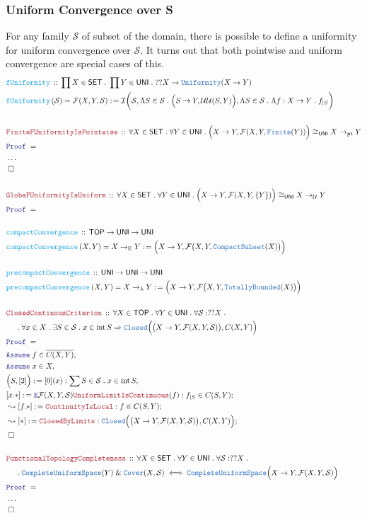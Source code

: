 \documentclass[12pt]{scrartcl}
\newcommand{\TYPE}[1]{\textcolor{NavyBlue}{\mathtt{#1}}}
\newcommand{\FUNC}[1]{\textcolor{Cerulean}{\mathtt{#1}}}
\newcommand{\LOGIC}[1]{\textcolor{Blue}{\mathtt{#1}}}
\newcommand{\THM}[1]{\textcolor{Maroon}{\mathtt{#1}}}
\renewcommand{\.}{\; . \;}
\newcommand{\de}{: \kern 0.1pc =}
\newcommand{\Act}[1]{\left( #1 \right)}
\newcommand{\Theorem}[2]{& \THM{#1} \, :: \, #2 \\ & \Proof = \\ }
\newcommand{\DeclareFunc}[2]{& \FUNC{#1} \, :: \, #2 \\}
\newcommand{\DefineNamedFunc}[4]{&  \FUNC{#1}\Act{#2} = #3 \de #4 \\}
\newcommand{\NewLine}{\\ & \kern 1pc}
\newcommand{\Page}[1]{ \begin{align*} #1 \end{align*}   }
\newcommand{\NoProof}{ & \ldots \\ \EndProof}
\renewcommand{\And}{\; \& \;}
\newcommand{\Imply}{\Rightarrow}
\newcommand{\Finite}{\TYPE{Finite}}
\newcommand{\Say}[3]{& #1 \de #2 : #3, \\}
\newcommand{\Conclude}[3]{& #1 \de #2 : #3; \\}
\newcommand{\DeriveConclude}[3]{& \leadsto #1 \de #2 : #3 ; \\}
\newcommand{\AssumeIn}[2]{& \LOGIC{Assume} \; #1 \in #2, \\}
\newcommand{\Elim}{\LOGIC{E}}
\newcommand{\QED}{\; \square}
\newcommand{\EndProof}{& \QED \\}
\newcommand{\Proof}{\LOGIC{Proof} \; }
\newcommand{\I}{\mathcal{I}}
\newcommand{\SET}{\mathsf{SET}}
\newcommand{\Closed}{\TYPE{Closed}}
\newcommand{\Compacts}{\TYPE{CompactSubset}}
\DeclareMathOperator*{\intx}{int}
\newcommand{\TOP}{\mathsf{TOP}}
\renewcommand{\U}{\mathcal{U}}
\newcommand{\F}{\mathcal{F}}
\newcommand{\UNI}{\mathsf{UNI}}
\renewcommand{\S}{\mathcal{S}}
\newcommand{\Unif}{\TYPE{Uniformity}}
\newcommand{\CUS}{\TYPE{CompleteUniformSpace}}
\newcommand{\TB}{\TYPE{TotallyBounded}}
\newcommand{\pt}{\mathrm{pt}}
\renewcommand{\S}{\mathcal{S}}
\begin{document}
\subsubsection{Uniform Convergence over S}
For any family $\S$ of subset of the domain, there is possible to define a uniformity for uniform convergence over $\S$. It turns out that both pointwise and uniform convergence are special cases of this.
\Page{
	\DeclareFunc{fUniformity}
	{
		\prod X \in \SET \.
		\prod Y \in \UNI \.
		??X \to \Unif(X \to Y)	
	}
	\DefineNamedFunc{fUniformity}{\mathcal{S}}{\F(X,Y,\mathcal{S})}
	{
			\I\bigg(
				\mathcal{S}, 
				\Lambda S \in \mathcal{S} \. \Big(S \to Y, \U\U(S,Y)\Big),
				\Lambda S \in \mathcal{S} \. \Lambda f : X \to Y \. f_{|S}    
			\bigg)	
	}
	\\
	\Theorem{FiniteFUniformityIsPointwise}
	{
		\forall X \in \SET \.
		\forall Y \in \UNI \. 
		\Big( X \to Y, \F(X,Y,\Finite(Y)) \Big) \cong_\UNI X \to_\pt Y
	}
	\NoProof
	\\
	\Theorem{GlobaFUniformityIsUniform}
	{
		\forall X \in \SET \.
		\forall Y \in \UNI \.
		\Big( X \to Y, \F(X,Y,\{Y\}) \Big) \cong_\UNI X \to_\U Y
	}
	\\
	\DeclareFunc{compactConvergence}
	{
		\TOP \to \UNI \to \UNI	
	}
	\DefineNamedFunc{compactConvergence}{X,Y}{X \to_\mathbb{K} Y}
	{
			\Big( X \to Y, \F\big(X,Y,\Compacts(X)\big)\Big)
	}
	\\
	\DeclareFunc{precompactConvergence}
	{
		\UNI \to \UNI \to \UNI
	}
	\DefineNamedFunc{precompactConvergence}{X,Y}{X \to_\lambda Y}
	{
			\Big( X \to Y, \F\big(X,Y,\TB(X)\big)\Big)
	}
	\\
	\Theorem{ClosedContinousCriterion}
	{
		\forall X \in \TOP \.
		\forall Y \in \UNI \.
		\forall \mathcal{S} : ??X \.\NewLine \.
		\forall x \in X \.
		\exists S \in \mathcal{S} \.
		x \in \intx S
		\Imply
		\Closed\Big( \big(X \to Y,\F(X,Y,\mathcal{S})\big) ,C(X,Y)\Big)
	}
	\AssumeIn{f}{\overline{C(X,Y)}}
	\AssumeIn{x}{X}
	\Say{\Big(S,[2]\Big)}{[0](x)}
	{
		\sum S \in \mathcal{S} \. 
		x \in \intx S
	}
	\Conclude{[x.*]}{\Elim \F(X,Y,\mathcal{S}) \THM{UniformLimitIsContinuous}(f)}
	{
		f_{|S} \in C(S,Y)
	}
	\DeriveConclude{[f.*]}{\THM{ContinuityIsLocal}}
	{
		f \in C(S,Y)
	}
	\DeriveConclude{[*]}{\THM{ClosedByLimits}}
	{
		\Closed\Big( \big(X \to Y,\F(X,Y,\mathcal{S})\big) ,C(X,Y)\Big)
	}
	\EndProof
	\\
	\Theorem{FunctionalTopologyCompleteness}
	{
		\forall X \in \SET \.
		\forall Y \in \UNI \.
		\forall \mathcal{S} : ??X \. \NewLine \.
		\CUS(Y) \And \TYPE{Cover}(X,\mathcal{S}) 
		\iff 
		\CUS\Big( X \to Y,  \F(X,Y,\mathcal{S})\Big)
	}
	\NoProof
}
\newpage
\end{document}

